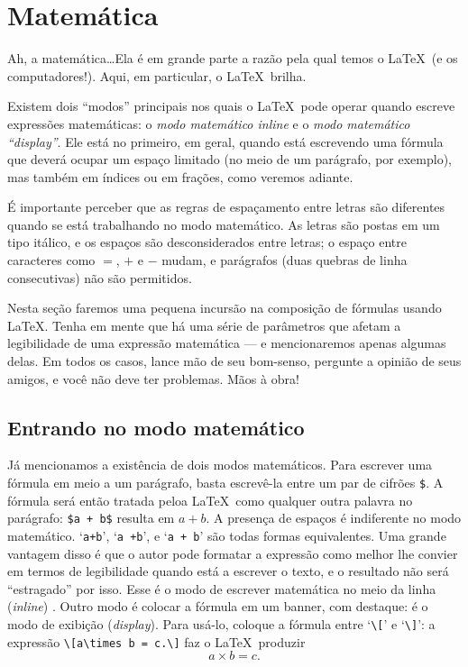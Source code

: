\section{Matemática}\label{sec:matematica}

Ah, a matemática\ldots Ela é em grande parte a razão pela qual temos o
\LaTeX\ (e os computadores!). Aqui, em particular, o \LaTeX\ brilha.


Existem dois ``modos'' principais nos quais o \LaTeX\ pode operar
quando escreve expressões matemáticas: o \emph{modo matemático inline}
e o \emph{modo matemático ``display''}. Ele está no primeiro, em
geral, quando está escrevendo uma fórmula que deverá ocupar um espaço
limitado (no meio de um parágrafo, por exemplo), mas também em índices
ou em frações, como veremos adiante.

É importante perceber que as regras de espaçamento entre letras são
diferentes quando se está trabalhando no modo matemático. As letras
são postas em um tipo itálico, e os espaços são desconsiderados entre
letras; o espaço entre caracteres como $=$, $+$ e $-$ mudam, e
parágrafos (duas quebras de linha consecutivas) não são
permitidos.

Nesta seção faremos uma pequena incursão na composição de fórmulas
usando \LaTeX. Tenha em mente que há uma série de parâmetros que
afetam a legibilidade de uma expressão matemática --- e
mencionaremos apenas algumas delas. Em todos os casos, lance mão de
seu bom-senso, pergunte a opinião de seus amigos, e você não deve ter
problemas. Mãos à obra!

\subsection{Entrando no modo matemático}

Já mencionamos a existência de dois modos matemáticos. Para escrever
uma fórmula em meio a um parágrafo, basta escrevê-la entre um par de
cifrões \verb'$'. A fórmula será então tratada peloa \LaTeX\ como
qualquer outra palavra no parágrafo: \verb'$a + b$' resulta em
$a+b$. A presença de espaços é indiferente no modo
matemático. `\verb'a+b'', `\verb'a +b'', e `\verb'a + b'' são todas formas
equivalentes. Uma grande vantagem disso é que o autor pode formatar a
expressão como melhor lhe convier em termos de legibilidade quando
está a escrever o texto, e o resultado não será ``estragado'' por
isso. Esse é o modo de escrever matemática no meio da linha
(\emph{inline}) . Outro modo é
colocar a fórmula em um banner, com destaque: é o modo de exibição
(\emph{display}). Para usá-lo,
coloque a fórmula entre `\verb'\['' e `\verb'\]'': a expressão
\verb'\[a\times b = c.\]' faz o \LaTeX\ produzir
\[
a\times b = c.
\]

